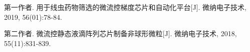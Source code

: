 
\begin{publications}{99}
    \item\textsc{第一作者}. {用于线虫药物筛选的微流控梯度芯片和自动化平台}[J]. 微纳电子技术, 2019, 56(01):78-84.                                
    \item\textsc{第二作者}. {微流控静态液滴阵列芯片制备非球形微粒}[J]. 微纳电子技术, 2018, 55(11):831-839.
\end{publications}
